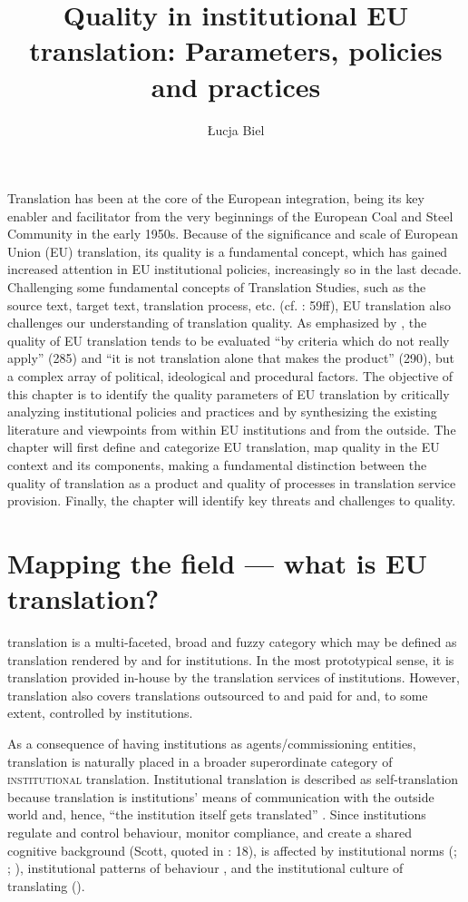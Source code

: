 \documentclass[output=paper]{langsci/langscibook}
\author{Łucja Biel\affiliation{University of Warsaw}}
\title{Quality in institutional EU translation: Parameters, policies and practices}
\begin{document}
 


Translation has been at the core of the European integration, being its key enabler and facilitator from the very beginnings of the European Coal and Steel Community in the early 1950s. Because of the significance and scale of European Union (EU) translation, its quality is a fundamental concept, which has gained increased attention in EU institutional policies, increasingly so in the last decade. Challenging some fundamental concepts of Translation Studies, such as the source text, target text, translation process, etc. (cf. \citealt{Biel2014}: 59ff), EU translation also challenges our understanding of translation quality. As emphasized by \citet{Dollerup2001}, the quality of EU translation tends to be evaluated “by criteria which do not really apply” (285) and “it is not translation alone that makes the product” (290), but a complex array of political, ideological and procedural factors. The objective of this chapter is to identify the quality parameters of EU translation by critically analyzing institutional policies and practices and by synthesizing the existing literature and viewpoints from within EU institutions and from the outside. The chapter will first define and categorize EU translation, map quality in the EU context and its components, making a fundamental distinction between the quality of translation as a product and quality of processes in translation service provision. Finally, the chapter will identify key threats and challenges to quality.

\section{Mapping the field — what is EU translation?}\label{sec:biel:1}

 translation is a multi-faceted, broad and fuzzy category which may be defined as translation rendered by and for  institutions. In the most prototypical sense, it is translation provided in-house by the translation services of  institutions. However,  translation also covers translations outsourced to  and paid for and, to some extent, controlled by  institutions.

As a consequence of having institutions as agents/commissioning entities,  translation is naturally placed in a broader superordinate category of \textsc{institutional} translation. Institutional translation is described as self-translation because translation is institutions’ means of communication with the outside world and, hence, “the institution itself gets translated” \citep[22]{Koskinen2008}. Since institutions regulate and control behaviour, monitor compliance, and create a shared cognitive background (Scott, quoted in \citealt{Koskinen2008}: 18),  is affected by institutional norms (\citealt[50]{Koskinen2000}; \citealt[65]{WagnerEtAl2002}; \citealt[101]{Felici2010}), institutional patterns of behaviour \citep[144]{Kang2011}, and the institutional culture of translating (\citealt[470]{Mason2004[2003]}). 
\end{document}

